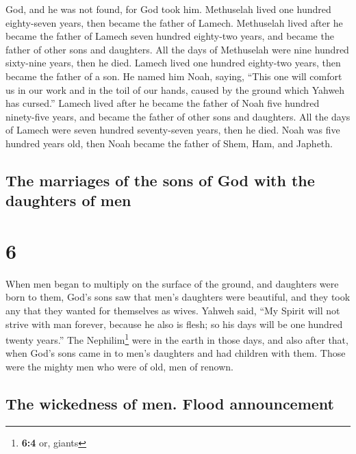 God, and he was not found, for God took him.  Methuselah
lived one hundred eighty-seven years, then became the father of Lamech.
 Methuselah lived after he became the father of Lamech
seven hundred eighty-two years, and became the father of other sons and
daughters.  All the days of Methuselah were nine hundred
sixty-nine years, then he died.  Lamech lived one hundred
eighty-two years, then became the father of a son.  He
named him Noah, saying, ``This one will comfort us in our work and in
the toil of our hands, caused by the ground which Yahweh has cursed.''
 Lamech lived after he became the father of Noah five
hundred ninety-five years, and became the father of other sons and
daughters.  All the days of Lamech were seven hundred
seventy-seven years, then he died.  Noah was five hundred
years old, then Noah became the father of Shem, Ham, and Japheth.

\hypertarget{the-marriages-of-the-sons-of-god-with-the-daughters-of-men}{%
\subsection{The marriages of the sons of God with the daughters of
men}\label{the-marriages-of-the-sons-of-god-with-the-daughters-of-men}}

\hypertarget{section-5}{%
\section{6}\label{section-5}}

 When men began to multiply on the surface of the ground,
and daughters were born to them,  God's sons saw that
men's daughters were beautiful, and they took any that they wanted for
themselves as wives.  Yahweh said, ``My Spirit will not
strive with man forever, because he also is flesh; so his days will be
one hundred twenty years.''  The Nephilim\footnote{\textbf{6:4}
  or, giants} were in the earth in those days, and also after that, when
God's sons came in to men's daughters and had children with them. Those
were the mighty men who were of old, men of renown.

\hypertarget{the-wickedness-of-men.-flood-announcement}{%
\subsection{The wickedness of men. Flood
announcement}\label{the-wickedness-of-men.-flood-announcement}}

